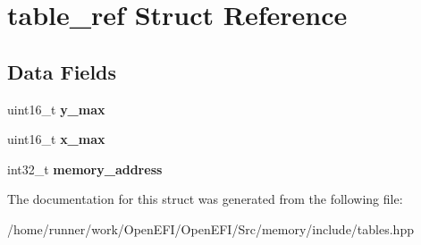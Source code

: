 \hypertarget{structtable__ref}{}\section{table\+\_\+ref Struct Reference}
\label{structtable__ref}
\subsection*{Data Fields}
\begin{DoxyCompactItemize}
\item 
\mbox{\label{structtable__ref_a0d60a4590c9e8624656d828668430c15}} 
uint16\+\_\+t {\bfseries y\+\_\+max}
\item 
\mbox{\label{structtable__ref_a53f68b2abfd2aef88f424542a81be14d}} 
uint16\+\_\+t {\bfseries x\+\_\+max}
\item 
\mbox{\label{structtable__ref_aacc33c8fbb7d1208c0d7fabf1def952d}} 
int32\+\_\+t {\bfseries memory\+\_\+address}
\end{DoxyCompactItemize}


The documentation for this struct was generated from the following file\+:\begin{DoxyCompactItemize}
\item 
/home/runner/work/\+Open\+E\+F\+I/\+Open\+E\+F\+I/\+Src/memory/include/tables.\+hpp\end{DoxyCompactItemize}
